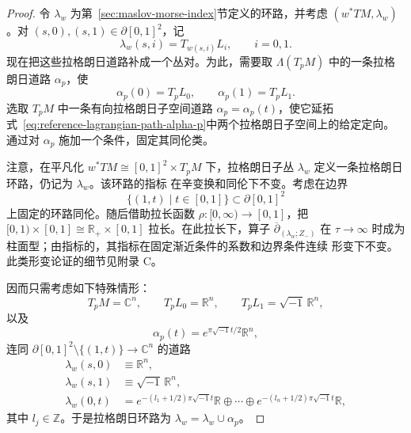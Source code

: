 \begin{proof}
令 $\lambda_w$ 为第~\ref{sec:maslov-morse-index}节定义的环路，并考虑\termBundlePair{}
$(w^*TM,\lambda_w)$。对 $(s,0),(s,1)\in\partial[0,1]^2$，记
\[
 \lambda_w(s,i)=T_{w(s,i)}L_i,
 \qquad i=0,1.
\]
现在把这些拉格朗日道路补成一个丛对。为此，需要取
$\Lambda(T_pM)$ 中的一条拉格朗日道路 $\alpha_p$，使
\begin{equation}
 \alpha_p(0)=T_pL_0,
 \qquad
 \alpha_p(1)=T_pL_1.
 \label{eq:reference-lagrangian-path-alpha-p}
\end{equation}
选取 $T_pM$ 中一条有向拉格朗日子空间道路 $\alpha_p=\alpha_p(t)$，使它延拓
式~\eqref{eq:reference-lagrangian-path-alpha-p}中两个拉格朗日子空间上的给定定向。
通过对 $\alpha_p$ 施加一个条件，固定其同伦类。

注意，在平凡化 $w^*TM\cong[0,1]^2\times T_pM$ 下，拉格朗日子丛
$\lambda_w$ 定义一条拉格朗日环路，仍记为 $\lambda_w$。该环路的\personMaslov{}指标
在辛变换和同伦下不变。考虑在边界
\[
 \{(1,t)\mid t\in[0,1]\}\subset\partial[0,1]^2
\]
上固定的环路同伦。随后借助拉长函数
$\rho:[0,\infty)\to[0,1]$，把
$[0,1)\times[0,1]\cong\mathbb R_+\times[0,1]$ 拉长。在此拉长下，算子
$\overline\partial_{(\lambda_w;Z_-)}$ 在 $\tau\to\infty$ 时成为柱面型；由\personFredholm{}指标的\termHomotopyInvariance{}，其指标在固定渐近条件的系数和边界条件连续
形变下不变。此类形变论证的细节见附录 C。

因而只需考虑如下特殊情形：
\[
 T_pM=\mathbb C^n,
 \qquad T_pL_0=\mathbb R^n,
 \qquad T_pL_1=\sqrt{-1}\,\mathbb R^n,
\]
以及
\[
 \alpha_p(t)=e^{\pi\sqrt{-1}t/2}\mathbb R^n,
\]
连同 $\partial[0,1]^2\setminus\{(1,t)\}\to\mathbb C^n$ 的道路
\[
\begin{aligned}
 \lambda_w(s,0)&\equiv\mathbb R^n,\\
 \lambda_w(s,1)&\equiv\sqrt{-1}\,\mathbb R^n,\\
 \lambda_w(0,t)&=
 e^{-(l_1+1/2)\pi\sqrt{-1}t}\mathbb R
 \oplus\cdots\oplus
 e^{-(l_n+1/2)\pi\sqrt{-1}t}\mathbb R,
\end{aligned}
\]
其中 $l_j\in\mathbb Z$。于是拉格朗日环路为 $\lambda_w=\lambda_w\cup\alpha_p$。


\end{proof}

